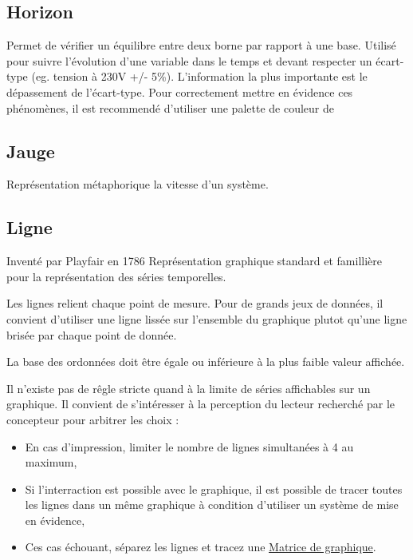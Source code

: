 \documentclass[a4paper,12pt]{article}
\begin{document}
\begin{multicols}{2}
\subsection*{Horizon}
\label{sec:orge1fc7d2}
Permet de vérifier un équilibre entre deux borne par rapport à une base. \autocite{alansmithLexiqueVisuel}  Utilisé pour suivre l'évolution d'une variable dans le temps et devant respecter un écart-type (eg. tension à 230V +/- 5\%). L'information la plus importante est le dépassement de l'écart-type. Pour correctement mettre en évidence ces phénomènes, il est recommendé d'utiliser une palette de couleur de
\subsection*{Jauge}
\label{sec:org5030087}
Représentation métaphorique la vitesse d'un système.
\subsection*{Ligne}
\label{sec:orgb3ac142}
Inventé par Playfair en 1786 \autocite{sosulskiBecomingVisual2019}
Représentation graphique standard et famillière pour la représentation des séries temporelles. \autocite[,@Schwabish2021p86]{alansmithLexiqueVisuel}

Les lignes relient chaque point de mesure. Pour de grands jeux de données, il convient d'utiliser une ligne lissée sur l'ensemble du graphique plutot qu'une ligne brisée par chaque point de donnée. \autocite{wilkeDirectoryVisualizations2019}

La base des ordonnées doit être égale ou inférieure à la plus faible valeur affichée. \autocite{Wong2010}

Il n'existe pas de rêgle stricte quand à la limite de séries affichables sur un graphique.\autocite{jonathanschwabishTime2021} Il convient de s'intéresser à la perception du lecteur recherché par le concepteur pour arbitrer les choix : \autocite{jonathanschwabishTime2021}
\begin{itemize}
\item En cas d'impression, limiter le nombre de lignes simultanées à 4 au maximum, \autocite{Wong2010}
\item Si l'interraction est possible avec le graphique, il est possible de tracer toutes les lignes dans un même graphique à condition d'utiliser un système de mise en évidence,\autocite{jonathanschwabishTime2021}
\item Ces cas échouant, séparez les lignes et tracez une \hyperref[sec:org9f8620b]{Matrice de graphique}.
\end{itemize}


\end{multicols}
\end{document}

